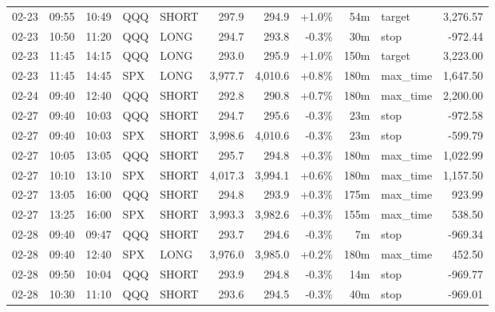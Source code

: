 \documentclass[11pt,a4paper,twoside]{article}
\begin{document}
\begin{center}
\begin{longtable}{>{\color{txtmain}}l l l l l r r r r >{\color{txtmain}}l r}
02-23 & 09:55 & 10:49 & QQQ & SHORT & 297.9 & 294.9 & \textcolor{wingreen}{+1.0\%} & 54m & target & \textcolor{wingreen}{3,276.57} \\
02-23 & 10:50 & 11:20 & QQQ & LONG & 294.7 & 293.8 & \textcolor{lossred}{-0.3\%} & 30m & stop & \textcolor{lossred}{-972.44} \\
02-23 & 11:45 & 14:15 & QQQ & LONG & 293.0 & 295.9 & \textcolor{wingreen}{+1.0\%} & 150m & target & \textcolor{wingreen}{3,223.00} \\
02-23 & 11:45 & 14:45 & SPX & LONG & 3,977.7 & 4,010.6 & \textcolor{wingreen}{+0.8\%} & 180m & max\_time & \textcolor{wingreen}{1,647.50} \\
02-24 & 09:40 & 12:40 & QQQ & SHORT & 292.8 & 290.8 & \textcolor{wingreen}{+0.7\%} & 180m & max\_time & \textcolor{wingreen}{2,200.00} \\
02-27 & 09:40 & 10:03 & QQQ & SHORT & 294.7 & 295.6 & \textcolor{lossred}{-0.3\%} & 23m & stop & \textcolor{lossred}{-972.58} \\
02-27 & 09:40 & 10:03 & SPX & SHORT & 3,998.6 & 4,010.6 & \textcolor{lossred}{-0.3\%} & 23m & stop & \textcolor{lossred}{-599.79} \\
02-27 & 10:05 & 13:05 & QQQ & SHORT & 295.7 & 294.8 & \textcolor{wingreen}{+0.3\%} & 180m & max\_time & \textcolor{wingreen}{1,022.99} \\
02-27 & 10:10 & 13:10 & SPX & SHORT & 4,017.3 & 3,994.1 & \textcolor{wingreen}{+0.6\%} & 180m & max\_time & \textcolor{wingreen}{1,157.50} \\
02-27 & 13:05 & 16:00 & QQQ & SHORT & 294.8 & 293.9 & \textcolor{wingreen}{+0.3\%} & 175m & max\_time & \textcolor{wingreen}{923.99} \\
02-27 & 13:25 & 16:00 & SPX & SHORT & 3,993.3 & 3,982.6 & \textcolor{wingreen}{+0.3\%} & 155m & max\_time & \textcolor{wingreen}{538.50} \\
02-28 & 09:40 & 09:47 & QQQ & SHORT & 293.7 & 294.6 & \textcolor{lossred}{-0.3\%} & 7m & stop & \textcolor{lossred}{-969.34} \\
02-28 & 09:40 & 12:40 & SPX & LONG & 3,976.0 & 3,985.0 & \textcolor{wingreen}{+0.2\%} & 180m & max\_time & \textcolor{wingreen}{452.50} \\
02-28 & 09:50 & 10:04 & QQQ & SHORT & 293.9 & 294.8 & \textcolor{lossred}{-0.3\%} & 14m & stop & \textcolor{lossred}{-969.77} \\
02-28 & 10:30 & 11:10 & QQQ & SHORT & 293.6 & 294.5 & \textcolor{lossred}{-0.3\%} & 40m & stop & \textcolor{lossred}{-969.01} \\

\end{longtable}
\end{center}
\end{document}

